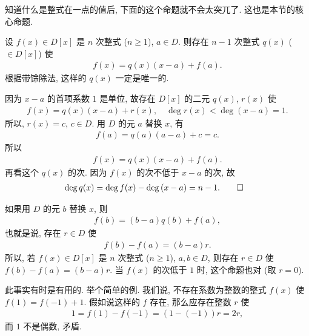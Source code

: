 知道什么是整式在一点的值后, 下面的这个命题就不会太突兀了. 这也是本节的核心命题.

\begin{proposition}
    设 $f(x) \in D[x]$ 是 $n$ 次整式 ($n \geq 1$), $a \in D$. 则存在 $n-1$ 次整式 $q(x)$ ($\in D[x]$) 使
    \begin{align*}
        f(x) = q(x) (x-a) + f(a).
    \end{align*}
    根据带馀除法, 这样的 $q(x)$ 一定是唯一的.
\end{proposition}

\begin{pf}
    因为 $x-a$ 的首项系数 $1$ 是单位, 故存在 $D[x]$ 的二元 $q(x)$, $r(x)$ 使
    \begin{align*}
        f(x) = q(x) (x-a) + r(x), \quad \deg r(x) < \deg {(x-a)} = 1.
    \end{align*}
    所以, $r(x) = c$, $c \in D$. 用 $D$ 的元 $a$ 替换 $x$, 有
    \begin{align*}
        f(a) = q(a) (a-a) + c = c.
    \end{align*}
    所以
    \begin{align*}
        f(x) = q(x) (x-a) + f(a).
    \end{align*}
    再看这个 $q(x)$ 的次. 因为 $f(x)$ 的次不低于 $x-a$ 的次, 故
    \begin{align*}
         & \deg q(x) = \deg f(x) - \deg {(x-a)} = n-1. \qedhere
    \end{align*}
\end{pf}

\begin{remark}
    如果用 $D$ 的元 $b$ 替换 $x$, 则
    \begin{align*}
        f(b) = (b-a)q(b) + f(a),
    \end{align*}
    也就是说, 存在 $r \in D$ 使
    \begin{align*}
        f(b) - f(a) = (b-a)r.
    \end{align*}
    所以, 若 $f(x) \in D[x]$ 是 $n$ 次整式 ($n \geq 1$), $a,b \in D$, 则存在 $r \in D$ 使 $f(b) - f(a) = (b-a)r$. 当 $f(x)$ 的次低于 $1$ 时, 这个命题也对 (取 $r=0$).

    此事实有时是有用的. 举个简单的例. 我们说, 不存在系数为整数的整式 $f(x)$ 使 $f(1) = f(-1) + 1$. 假如说这样的 $f$ 存在, 那么应存在整数 $r$ 使
    \begin{align*}
        1 = f(1) - f(-1) = (1 - (-1))r = 2r,
    \end{align*}
    而 $1$ 不是偶数, 矛盾.
\end{remark}
